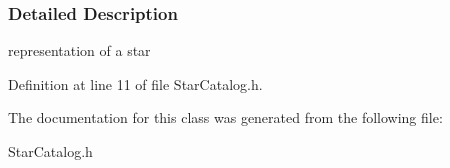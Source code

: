 \subsubsection{Detailed Description}
representation of a star 

Definition at line 11 of file StarCatalog.h.



The documentation for this class was generated from the following file:\begin{DoxyCompactItemize}
\item 
StarCatalog.h\end{DoxyCompactItemize}
